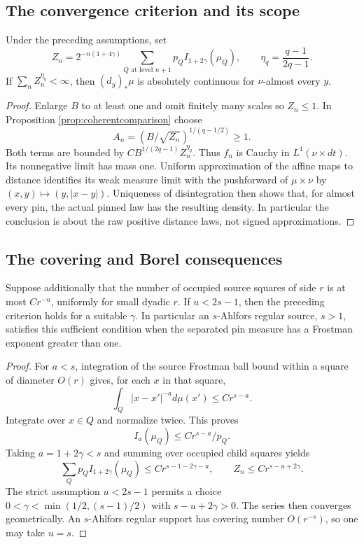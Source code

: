 \subsection{The convergence criterion and its scope}

\begin{theorem}\label{thm:coherentcriterion}
Under the preceding assumptions, set
$$
Z_n=2^{-n(1+4\gamma)}
\sum_{Q\text{ at level }n+1}p_QI_{1+2\gamma}(\mu_Q),\qquad
\eta_q=\frac{q-1}{2q-1}.
$$
If \(\sum_n Z_n^{\eta_q}<\infty\), then \((d_y)_*\mu\) is absolutely continuous for \(\nu\)-almost every \(y\).
\end{theorem}
\begin{proof}
Enlarge \(B\) to at least one and omit finitely many scales so \(Z_n\leq1\). In Proposition \ref{prop:coherentcomparison} choose
$$
A_n=(B/\sqrt{Z_n})^{1/(q-1/2)}\geq1.
$$
Both terms are bounded by \(C B^{1/(2q-1)}Z_n^{\eta_q}\). Thus \(f_n\) is Cauchy in \(L^1(\nu\times dt)\). Its nonnegative limit has mass one. Uniform approximation of the affine maps to distance identifies its weak measure limit with the pushforward of \(\mu\times\nu\) by \((x,y)\mapsto(y,|x-y|)\). Uniqueness of disintegration then shows that, for almost every pin, the actual pinned law has the resulting density. In particular the conclusion is about the raw positive distance laws, not signed approximations.
\end{proof}

\subsection{The covering and Borel consequences}

\begin{proposition}\label{prop:coherentcovering}
Suppose additionally that the number of occupied source squares of side \(r\) is at most \(Cr^{-u}\), uniformly for small dyadic \(r\). If \(u<2s-1\), then the preceding criterion holds for a suitable \(\gamma\). In particular an \(s\)-Ahlfors regular source, \(s>1\), satisfies this sufficient condition when the separated pin measure has a Frostman exponent greater than one.
\end{proposition}
\begin{proof}
For \(a<s\), integration of the source Frostman ball bound within a square of diameter \(O(r)\) gives, for each \(x\) in that square,
$$
\int_Q|x-x'|^{-a}d\mu(x')\leq C r^{s-a}.
$$
Integrate over \(x\in Q\) and normalize twice. This proves
$$
I_a(\mu_Q)\leq Cr^{s-a}/p_Q.
$$
Taking \(a=1+2\gamma<s\) and summing over occupied child squares yields
$$
\sum_Qp_QI_{1+2\gamma}(\mu_Q)\leq C r^{s-1-2\gamma-u},
\qquad Z_n\leq C r^{s-u+2\gamma}.
$$
The strict assumption \(u<2s-1\) permits a choice \(0<\gamma<\min(1/2,(s-1)/2)\) with \(s-u+2\gamma>0\). The series then converges geometrically. An \(s\)-Ahlfors regular support has covering number \(O(r^{-s})\), so one may take \(u=s\).
\end{proof}

